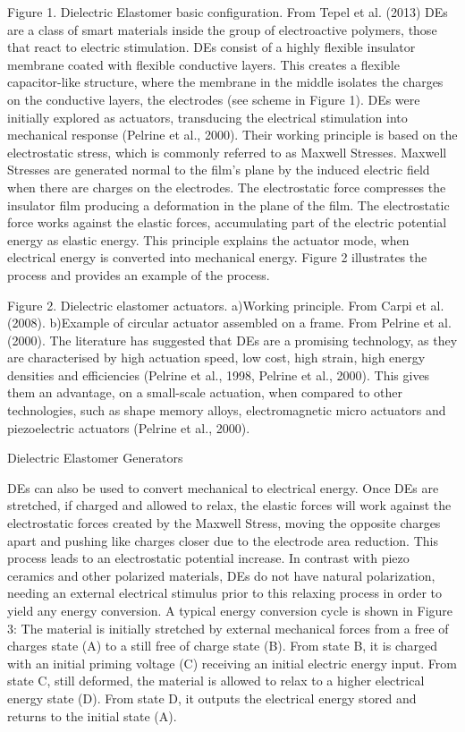  
Figure 1. Dielectric Elastomer basic configuration. From Tepel et al. (2013)
DEs are a class of smart materials inside the group of electroactive polymers, those that react to electric stimulation. DEs consist of a highly flexible insulator membrane coated with flexible conductive layers. This creates a flexible capacitor-like structure, where the membrane in the middle isolates the charges on the conductive layers, the electrodes (see scheme in Figure 1). DEs were initially explored as actuators, transducing the electrical stimulation into mechanical response (Pelrine et al., 2000). Their working principle is based on the electrostatic stress, which is commonly referred to as Maxwell Stresses. Maxwell Stresses are generated normal to the film’s plane by the induced electric field when there are charges on the electrodes. The electrostatic force compresses the insulator film producing a deformation in the plane of the film. The electrostatic force works against the elastic forces, accumulating part of the electric potential energy as elastic energy. This principle explains the actuator mode, when electrical energy is converted into mechanical energy.  Figure 2 illustrates the process and provides an example of the process.
 
Figure 2. Dielectric elastomer actuators. a)Working principle. From Carpi et al. (2008). b)Example of circular actuator assembled on a frame. From Pelrine et al. (2000).
The literature has suggested that DEs are a promising technology, as they are characterised by high actuation speed, low cost, high strain, high energy densities and efficiencies (Pelrine et al., 1998, Pelrine et al., 2000). This gives them an advantage, on a small-scale actuation,  when compared to other technologies, such as shape memory alloys, electromagnetic micro actuators and piezoelectric actuators (Pelrine et al., 2000). 

Dielectric Elastomer Generators

DEs can also be used to convert mechanical to electrical energy. Once DEs are stretched, if charged and allowed to relax, the elastic forces will work against the electrostatic forces created by the Maxwell Stress, moving the opposite charges apart and pushing like charges closer due to the electrode area reduction. This process leads to an electrostatic potential increase.
In contrast with piezo ceramics and other polarized materials, DEs do not have natural polarization, needing an external electrical stimulus prior to this relaxing process in order to yield any energy conversion.  A typical energy conversion cycle is shown in Figure 3: The material is initially stretched by external mechanical forces from a free of charges state (A) to a still free of charge state (B). From state B, it is charged with an initial priming voltage (C) receiving an initial electric energy input. From state C, still deformed, the material is allowed to relax to a higher electrical energy state (D). From state D, it outputs the electrical energy stored and returns to the initial state (A).
 
